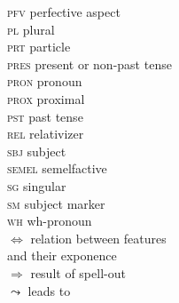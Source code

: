 \begin{multicols}{2}
\begin{tabbing}
\textsc{pfv}		\>	perfective aspect\\
\textsc{pl}			\>	plural\\
\textsc{prt}		\>	particle\\
\textsc{pres}		\>	present or non-past tense\\
\textsc{pron}		\>	pronoun\\
\textsc{prox}		\>	proximal\\
\textsc{pst}		\>	past tense\\
\textsc{rel}		\>	relativizer\\
\textsc{sbj}		\>	subject\\
\textsc{semel}		\>	semelfactive\\
\textsc{sg}		    \>	singular\\
\textsc{sm}		    \>	subject marker\\
\textsc{wh}		    \>	wh-pronoun\\
$\Leftrightarrow$	\>	relation between features \\ \> and their exponence\\
$\Rightarrow$       \>    	result of spell-out \\
$\leadsto$        	\>    	leads to \\
\end{tabbing}\end{multicols} 
